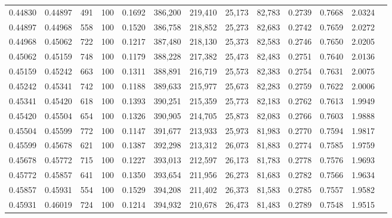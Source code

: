 \begin{tabular}{rrrrrrrrrrrrr}
0.44830 & 0.44897 &   491 & 100 &                                     0.1692 & 386,200 & 219,410 &  25,173 &  82,783 & 0.2739 & 0.7668 & 2.0324 \\
0.44897 & 0.44968 &   558 & 100 &                                     0.1520 & 386,758 & 218,852 &  25,273 &  82,683 & 0.2742 & 0.7659 & 2.0272 \\
0.44968 & 0.45062 &   722 & 100 &                                     0.1217 & 387,480 & 218,130 &  25,373 &  82,583 & 0.2746 & 0.7650 & 2.0205 \\
0.45062 & 0.45159 &   748 & 100 &                                     0.1179 & 388,228 & 217,382 &  25,473 &  82,483 & 0.2751 & 0.7640 & 2.0136 \\
0.45159 & 0.45242 &   663 & 100 &                                     0.1311 & 388,891 & 216,719 &  25,573 &  82,383 & 0.2754 & 0.7631 & 2.0075 \\
0.45242 & 0.45341 &   742 & 100 &                                     0.1188 & 389,633 & 215,977 &  25,673 &  82,283 & 0.2759 & 0.7622 & 2.0006 \\
0.45341 & 0.45420 &   618 & 100 &                                     0.1393 & 390,251 & 215,359 &  25,773 &  82,183 & 0.2762 & 0.7613 & 1.9949 \\
0.45420 & 0.45504 &   654 & 100 &                                     0.1326 & 390,905 & 214,705 &  25,873 &  82,083 & 0.2766 & 0.7603 & 1.9888 \\
0.45504 & 0.45599 &   772 & 100 &                                     0.1147 & 391,677 & 213,933 &  25,973 &  81,983 & 0.2770 & 0.7594 & 1.9817 \\
0.45599 & 0.45678 &   621 & 100 &                                     0.1387 & 392,298 & 213,312 &  26,073 &  81,883 & 0.2774 & 0.7585 & 1.9759 \\
0.45678 & 0.45772 &   715 & 100 &                                     0.1227 & 393,013 & 212,597 &  26,173 &  81,783 & 0.2778 & 0.7576 & 1.9693 \\
0.45772 & 0.45857 &   641 & 100 &                                     0.1350 & 393,654 & 211,956 &  26,273 &  81,683 & 0.2782 & 0.7566 & 1.9634 \\
0.45857 & 0.45931 &   554 & 100 &                                     0.1529 & 394,208 & 211,402 &  26,373 &  81,583 & 0.2785 & 0.7557 & 1.9582 \\
0.45931 & 0.46019 &   724 & 100 &                                     0.1214 & 394,932 & 210,678 &  26,473 &  81,483 & 0.2789 & 0.7548 & 1.9515 \\

\end{tabular}
